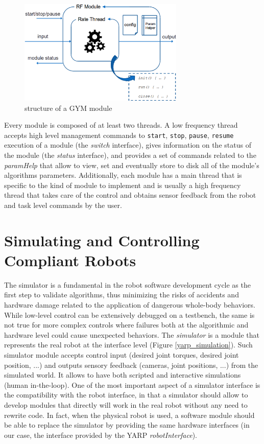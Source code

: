 \begin{figure}[!ht]
\centering
\includegraphics[width=0.7\textwidth]{images/GYM}
\caption{structure of a GYM module}
\label{gym}
\end{figure}

Every module is composed of at least two threads.
A low frequency thread accepts high level management commands to \texttt{start}, \texttt{stop}, \texttt{pause}, \texttt{resume} execution of a module (the \emph{switch} interface), gives information on the status of the module (the \emph{status} interface), and provides a set of commands related to the \emph{paramHelp} that allow to view, set and eventually store to disk all of the module's algorithms parameters. 
Additionally, each module has a main thread that is specific to the kind of module to implement and is usually a high frequency thread that takes care of the control and obtains sensor feedback from the robot and task level commands by the user.

\section{Simulating and Controlling Compliant Robots}
The simulator is a fundamental in the robot software development cycle as the first step to validate algorithms, thus minimizing the risks of accidents and hardware damage related to the application of dangerous whole-body behaviors. While low-level control can be extensively debugged on a testbench, the same is not true for more complex controls where failures both at the algorithmic and hardware level could cause unexpected behaviors.
The \emph{simulator} is a module that represents the real robot at the interface level (Figure \ref{yarp_simulation}). Such simulator module accepts control input (desired joint torques, desired joint position, ...) and outputs sensory feedback (cameras, joint positions, ...) from the simulated world. It allows to have both scripted and interactive simulations (human in-the-loop). One of the most important aspect of a simulator interface is the compatibility with the robot interface, in that a simulator should allow to develop modules that directly will work in the real robot without any need to rewrite code. In fact, when the physical robot is used, a software module should be able to replace the simulator by providing the same hardware interfaces (in our case, the interface provided by the YARP \emph{robotInterface}).

